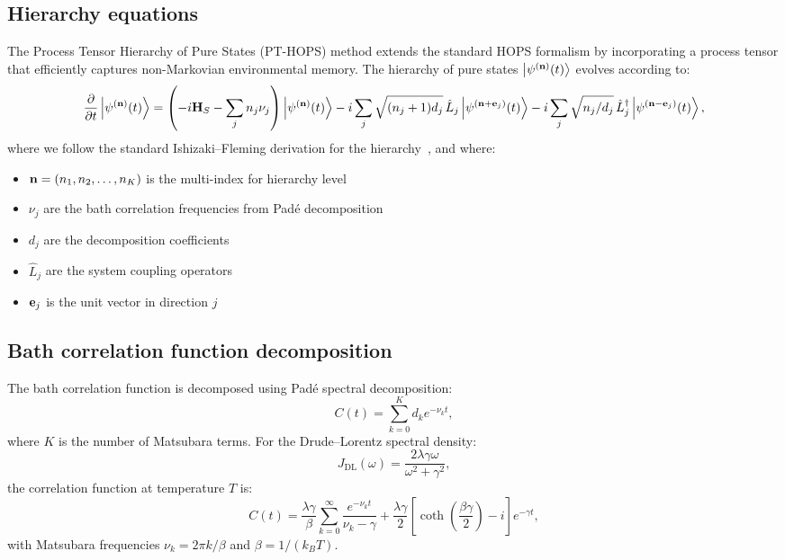 \documentclass[11pt,a4paper]{article}
\begin{document}
\subsection{Hierarchy equations}

The Process Tensor Hierarchy of Pure States (PT-HOPS) method extends the standard HOPS formalism by incorporating a process tensor that efficiently captures non-Markovian environmental memory. The hierarchy of pure states $\ket{\psi^{(\vb{n})}(t)}$ evolves according to:
\begin{equation}
\pdv{t}\ket{\psi^{(\vb{n})}(t)} = \left(-i\vb{H}_S - \sum_{j} n_j \nu_j\right)\ket{\psi^{(\vb{n})}(t)} 
- i\sum_{j} \sqrt{(n_j+1)d_j} \, \hat{L}_j \ket{\psi^{(\vb{n}+\vb{e}_j)}(t)} 
- i\sum_{j} \sqrt{n_j/d_j} \, \hat{L}_j^\dagger \ket{\psi^{(\vb{n}-\vb{e}_j)}(t)},
\label{eq:SI_hops}
\end{equation}
where we follow the standard Ishizaki--Fleming derivation for the hierarchy~\cite{Ishizaki2009a,Strathearn2018}, and where:
\begin{itemize}
\item $\vb{n} = (n_1, n_2, \ldots, n_K)$ is the multi-index for hierarchy level
\item $\nu_j$ are the bath correlation frequencies from Padé decomposition
\item $d_j$ are the decomposition coefficients
\item $\hat{L}_j$ are the system coupling operators
\item $\vb{e}_j$ is the unit vector in direction $j$
\end{itemize}

\subsection{Bath correlation function decomposition}

The bath correlation function is decomposed using Padé spectral decomposition:
\begin{equation}
C(t) = \sum_{k=0}^{K} d_k e^{-\nu_k t},
\label{eq:SI_bath_correlation}
\end{equation}
where $K$ is the number of Matsubara terms. For the Drude--Lorentz spectral density:
\begin{equation}
J_{\mathrm{DL}}(\omega) = \frac{2\lambda\gamma\omega}{\omega^2 + \gamma^2},
\label{eq:SI_drude_lorentz}
\end{equation}
the correlation function at temperature $T$ is:
\begin{equation}
C(t) = \frac{\lambda\gamma}{\beta}\sum_{k=0}^{\infty} \frac{e^{-\nu_k t}}{\nu_k - \gamma} + \frac{\lambda\gamma}{2}\left[\coth\left(\frac{\beta\gamma}{2}\right) - i\right]e^{-\gamma t},
\label{eq:SI_correlation_DL}
\end{equation}
with Matsubara frequencies $\nu_k = 2\pi k/\beta$ and $\beta = 1/(k_B T)$.
\end{document}
